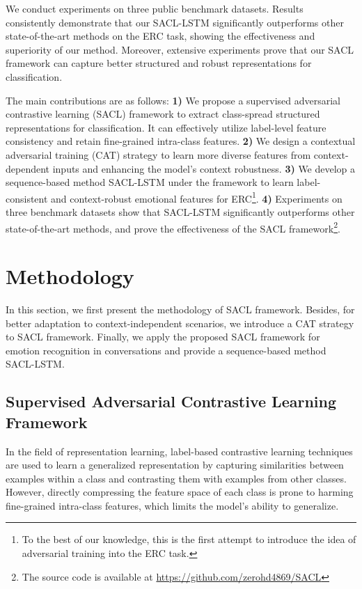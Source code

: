 \documentclass[11pt]{article}
\begin{document}
We conduct experiments on three public benchmark datasets. 
Results consistently demonstrate that our SACL-LSTM significantly outperforms other state-of-the-art methods on the ERC task, showing the effectiveness and superiority of our method. Moreover, extensive experiments prove that our SACL framework can capture better structured and robust representations for classification.

The main contributions are as follows:    
\textbf{1)} We propose a supervised adversarial contrastive learning (SACL) framework to extract class-spread structured representations for classification. It can effectively utilize label-level feature consistency and retain fine-grained intra-class features.
\textbf{2)} We design a contextual adversarial training (CAT) strategy to learn more diverse features from context-dependent inputs and enhancing the model’s context robustness.
\textbf{3)} We develop a sequence-based method SACL-LSTM under the framework to learn label-consistent and context-robust emotional features for ERC\footnote{To the best of our knowledge, this is the first attempt to introduce the idea of adversarial training into the ERC task.}. 
\textbf{4)} Experiments on three benchmark datasets show that SACL-LSTM significantly outperforms other state-of-the-art methods, and prove the effectiveness of the SACL framework\footnote{The source code is available at \url{https://github.com/zerohd4869/SACL}}.


\section{Methodology}
In this section, we first present the methodology of SACL framework.
Besides, for better adaptation to context-independent scenarios, we introduce a CAT strategy to SACL framework.
Finally, we apply the proposed SACL framework for emotion recognition in conversations and provide a sequence-based method SACL-LSTM.

\subsection{Supervised Adversarial Contrastive Learning Framework}
In the field of representation learning, label-based contrastive learning \cite{khosla2020supervised,lopez2022supervised} techniques are used to learn a generalized representation by capturing similarities between examples within a class and contrasting them with examples from other classes. However, directly compressing the feature space of each class is prone to harming fine-grained intra-class features, which limits the model’s ability to generalize. 
\end{document}
